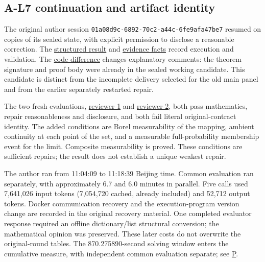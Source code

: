 \subsection[A-L7 continuation and artifact identity]{\texorpdfstring{\protect\hypertarget{o2}{}A-L7 continuation and artifact identity}{A-L7 continuation and artifact identity}}
The original author session \nolinkurl{01a08d9c-6892-70c2-a44c-6fe9afa47be7} resumed on copies of its sealed state, with explicit permission to disclose a reasonable correction. The \href{verification/revision13/a-l7/RESULTS.json}{structured result} and \href{verification/revision13/a-l7/FINAL_EVIDENCE.json}{evidence facts} record execution and validation. The \href{verification/revision13/a-l7/sealed-candidate-to-final.diff}{code difference} changes explanatory comments: the theorem signature and proof body were already in the sealed working candidate. This candidate is distinct from the incomplete delivery selected for the old main panel and from the earlier separately restarted repair.

The two fresh evaluations, \href{verification/revision13/a-l7/endpoint/reviewer-1/VALIDATED_RESULT.json}{reviewer 1} and \href{verification/revision13/a-l7/endpoint/reviewer-2/VALIDATED_RESULT.json}{reviewer 2}, both pass mathematics, repair reasonableness and disclosure, and both fail literal original-contract identity. The added conditions are Borel measurability of the mapping, ambient continuity at each point of the set, and a measurable full-probability membership event for the limit. Composite measurability is proved. These conditions are sufficient repairs; the result does not establish a unique weakest repair.

The author ran from 11:04:09 to 11:18:39 Beijing time. Common evaluation ran separately, with approximately 6.7 and 6.0 minutes in parallel. Five calls used 7,641,026 input tokens (7,054,720 cached, already included) and 52,712 output tokens. Docker communication recovery and the execution-program version change are recorded in the original recovery material. One completed evaluator response required an offline dictionary/list structural conversion; the mathematical opinion was preserved. These later costs do not overwrite the original-round tables. The 870.275890-second solving window enters the cumulative measure, with independent common evaluation separate; see \hyperlink{appendix-p}{P}.

